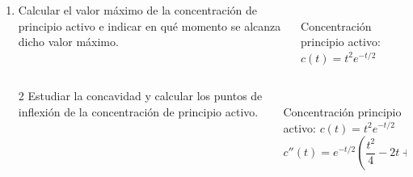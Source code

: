 \documentclass[aspectratio=169,10pt,xcolor=dvipsnames,t]{beamer}
\begin{document}
\begin{frame}
  \begin{columns}
    \begin{column}[T]{0.7\textwidth}
      \begin{enumerate}
        \item Calcular el valor máximo de la concentración de principio activo e indicar en qué momento se alcanza dicho valor máximo.
      \end{enumerate}
    \end{column}
    \quad
    \begin{column}[T]{0.3\textwidth}
      \\
      Concentración principio activo: $c(t) = t^2e^{-t/2}$
    \end{column}
  \end{columns}
\end{frame}


\begin{frame}
  \begin{columns}
    \begin{column}[T]{0.7\textwidth}
      \begin{enumerate}
        \item[2] Estudiar la concavidad y calcular los puntos de inflexión de la concentración de principio activo.
      \end{enumerate}
    \end{column}
    \quad
    \begin{column}[T]{0.3\textwidth}
      \\
      Concentración principio activo: $c(t) = t^2e^{-t/2}$\\
      $c''(t) = e^{-t/2}\left(\dfrac{t^2}{4}-2t+2\right)$
    \end{column}
  \end{columns}
\end{frame}
\end{document}
